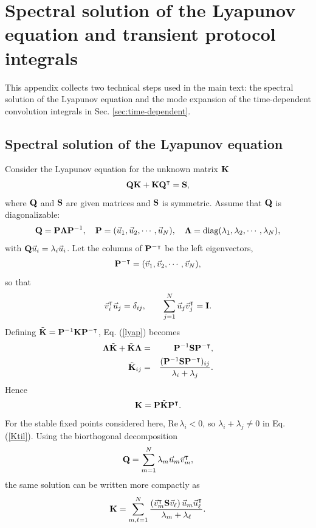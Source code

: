 \section{Spectral solution of the Lyapunov equation and transient protocol integrals}
\quad This appendix collects two technical steps used in the main text: the spectral solution of the Lyapunov equation and the mode expansion of the time-dependent convolution integrals in Sec. \ref{sec:time-dependent}.
\subsection*{Spectral solution of the Lyapunov equation}
Consider the Lyapunov equation for the unknown matrix ${\bf K}$ \cite{Behr2019SylvesterLyapunov}
\begin{equation}
{\bf Q}{\bf K}+{\bf K}{\bf Q}^\intercal={\bf S},
\label{lyap}
\end{equation}
where ${\bf Q}$ and ${\bf S}$ are given matrices and ${\bf S}$ is symmetric.
Assume that ${\bf Q}$ is diagonalizable:
\begin{equation}
{\bf Q}={\bf P}\boldsymbol{\Lambda}{\bf P}^{-1},\quad
{\bf P}=({\vec u_1},{\vec u_2},\cdots,{\vec u_N}),\quad
\boldsymbol{\Lambda}=\hbox{diag}(\lambda_1,\lambda_2,\cdots,\lambda_N),
\end{equation}
with ${\bf Q}{\vec u_i}=\lambda_i{\vec u_i}$. Let the columns of
${\bf P}^{-\intercal}$ be the left eigenvectors,
\begin{equation}
{\bf P}^{-\intercal}=({\vec v_1},{\vec v_2},\cdots,{\vec v_N}),
\end{equation}
so that
\begin{equation}
{\vec v_i}^\intercal{\vec u_j}=\delta_{ij},\qquad
\sum_{j=1}^N {\vec u_j}{\vec v_j}^\intercal={\bf I}.
\end{equation}
Defining ${\tilde{\bf K}}={\bf P}^{-1}{\bf K}{\bf P}^{-\intercal}$, Eq. (\ref{lyap}) becomes
\begin{eqnarray}
\boldsymbol{\Lambda}{\tilde{\bf K}}+{\tilde{\bf K}}\boldsymbol{\Lambda}
&=&{\bf P}^{-1}{\bf S}{\bf P}^{-\intercal},\\
{\tilde{\bf K}}_{ij}
&=&\frac{({\bf P}^{-1}{\bf S}{\bf P}^{-\intercal})_{ij}}{\lambda_i+\lambda_j}.
\label{Ktil}
\end{eqnarray}
Hence
\begin{equation}
{\bf K}={\bf P}{\tilde{\bf K}}{\bf P}^\intercal.
\end{equation}
For the stable fixed points considered here, $\mathrm{Re}\,\lambda_i<0$, so $\lambda_i+\lambda_j\neq 0$ in Eq. (\ref{Ktil}). Using the biorthogonal decomposition
\begin{equation}
{\bf Q}=\sum_{m=1}^N \lambda_m {\vec u_m}{\vec v_m}^\intercal,
\end{equation}
the same solution can be written more compactly as
\begin{equation}
{\bf K}=\sum_{m,\ell=1}^N
\frac{({\vec v_m}^\intercal{\bf S}{\vec v_\ell})\,{\vec u_m}{\vec u_\ell}^\intercal}
{\lambda_m+\lambda_\ell}.
\end{equation}
